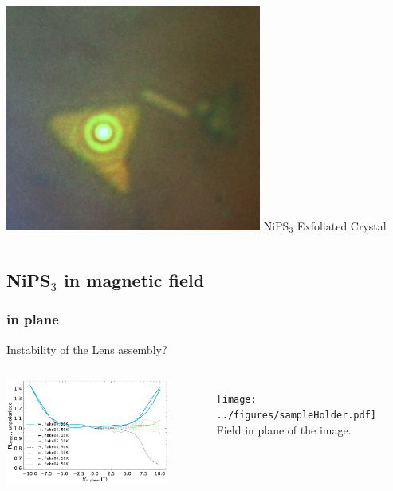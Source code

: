 \begin{frame}
\begin{columns}
		\centering
		\includegraphics[width=\textwidth]{../figures/sample_photos/exfoliated_NiPS3.png}
		NiPS$_3$ Exfoliated Crystal
	\end{columns}

\end{frame}


\subsection{NiPS$_3$ in magnetic field}
\subsubsection{in plane}
\subsectionframe

\begin{frame}{Instability of the Lens assembly?}
	\begin{columns}
		\centering
		\includegraphics{../figures/2023-12-10 lens movement.pdf}

		\begin{figure}
			\centering
			\texttt{[image: ../figures/sampleHolder.pdf]}
			Field in plane of the image.
		\end{figure}
	\end{columns}
\end{frame}

